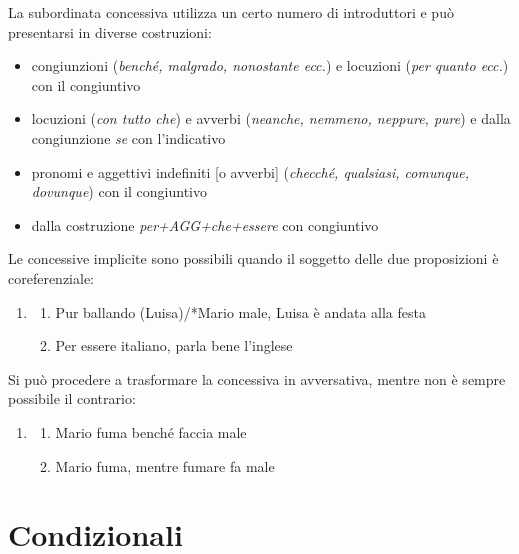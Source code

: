 \documentclass[
  a4paper,
  twoside,
  11pt,
  chapterprefix=false,
  bibliography=totocnumbered,
  listof=flat]{scrbook}
\providecommand{\tightlist}{%
  \setlength{\itemsep}{0pt}\setlength{\parskip}{0pt}}
\begin{document}
La subordinata concessiva utilizza un certo numero di introduttori e può presentarsi in diverse costruzioni:

\begin{itemize}
\item
  congiunzioni (\emph{benché, malgrado, nonostante ecc.}) e locuzioni (\emph{per quanto ecc.}) con il congiuntivo
\item
  locuzioni (\emph{con tutto che}) e avverbi (\emph{neanche, nemmeno, neppure, pure}) e dalla congiunzione \emph{se} con l'indicativo
\item
  pronomi e aggettivi indefiniti {[}o avverbi{]} (\emph{checché, qualsiasi, comunque, dovunque}) con il congiuntivo
\item
  dalla costruzione \emph{per+AGG+che+essere} con congiuntivo
\end{itemize}

Le concessive implicite sono possibili quando il soggetto delle due proposizioni è coreferenziale:

\begin{enumerate}
\def\labelenumi{(\arabic{enumi})}
\setcounter{enumi}{80}
\item
  \begin{enumerate}
  \def\labelenumii{\alph{enumii}.}
  \tightlist
  \item
    Pur ballando (Luisa)/*Mario male, Luisa è andata alla festa
  \item
    Per essere italiano, parla bene l'inglese
  \end{enumerate}
\end{enumerate}

Si può procedere a trasformare la concessiva in avversativa, mentre non è sempre possibile il contrario:

\begin{enumerate}
\def\labelenumi{(\arabic{enumi})}
\setcounter{enumi}{81}
\item
  \begin{enumerate}
  \def\labelenumii{\alph{enumii}.}
  \tightlist
  \item
    Mario fuma benché faccia male
  \item
    Mario fuma, mentre fumare fa male
  \end{enumerate}
\end{enumerate}

\hypertarget{condizionali}{%
\section{Condizionali}\label{condizionali}}
\end{document}
